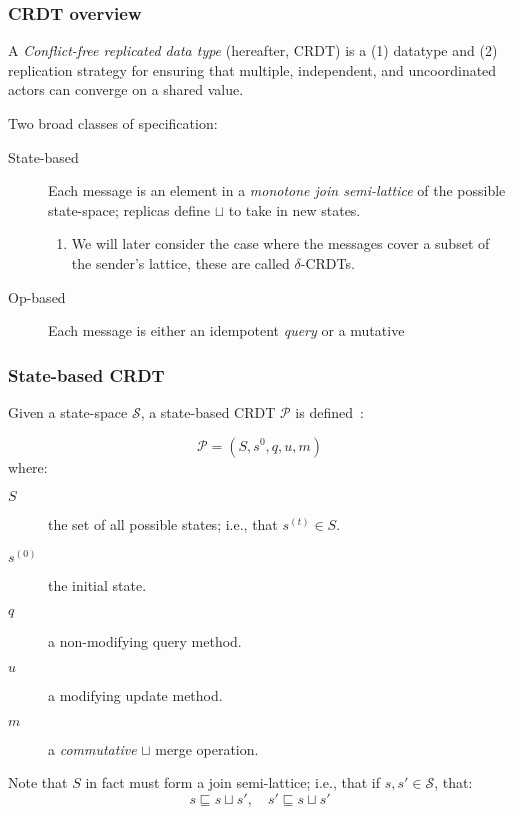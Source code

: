 \documentclass[aspectratio=169,compress]{beamer}
\begin{document}
  \begin{frame}
    \frametitle{CRDT overview}

    A \textit{Conflict-free replicated data type} (hereafter, CRDT) is a (1)
    datatype and (2) replication strategy for ensuring that multiple,
    independent, and uncoordinated actors can converge on a shared value.

    \vspace{1em}

    Two broad classes of specification:
    \begin{description}
      \item[State-based] Each message is an element in a \textit{monotone join
        semi-lattice} of the possible state-space; replicas define $\sqcup$ to
        take in new states.
        \begin{enumerate}
          \item We will later consider the case where the messages cover a
            subset of the sender's lattice, these are called $\delta$-CRDTs.
        \end{enumerate}
      \item[Op-based] Each message is either an idempotent \textit{query} or a
        mutative
    \end{description}
  \end{frame}

  \begin{frame}
    \frametitle{State-based CRDT}

    Given a state-space $\mathcal{S}$, a state-based CRDT $\mathcal{P}$ is
    defined~\parencite{shapiro11}:

    \[
      \mathcal{P} = (S, s^0, q, u, m)
    \]
    where:
    \begin{description}
      \item[$S$] the set of all possible states; i.e., that $s^{(t)} \in S$.
      \item[$s^{(0)}$] the initial state.
      \item[$q$] a non-modifying query method.
      \item[$u$] a modifying update method.
      \item[$m$] a \textit{commutative} $\sqcup$ merge operation.
    \end{description}

    \vspace{1em}

    Note that $S$ in fact must form a join semi-lattice; i.e., that if $s, s'
    \in \mathcal{S}$, that:
    \[
      s \sqsubseteq s \sqcup s',\quad s' \sqsubseteq s \sqcup s'
    \]
  \end{frame}
\end{document}

